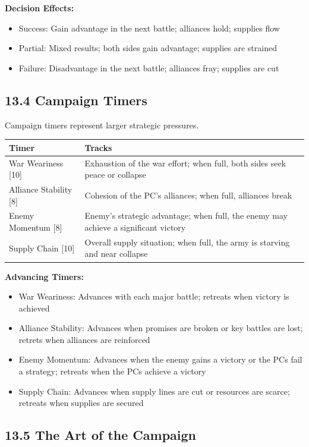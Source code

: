 \documentclass[11pt]{article}
\begin{document}
\textbf{Decision Effects:}
\begin{itemize}
  \item Success: Gain advantage in the next battle; alliances hold; supplies flow
  \item Partial: Mixed results; both sides gain advantage; supplies are strained
  \item Failure: Disadvantage in the next battle; alliances fray; supplies are cut
\end{itemize}

\subsection{13.4 Campaign Timers}

Campaign timers represent larger strategic pressures.

\begin{tabular}{|l|l|}
\hline
Timer & Tracks \\
\hline
War Weariness [10] & Exhaustion of the war effort; when full, both sides seek peace or collapse \\
\hline
Alliance Stability [8] & Cohesion of the PC's alliances; when full, alliances break \\
\hline
Enemy Momentum [8] & Enemy's strategic advantage; when full, the enemy may achieve a significant victory \\
\hline
Supply Chain [10] & Overall supply situation; when full, the army is starving and near collapse \\
\hline
\end{tabular}

\textbf{Advancing Timers:}
\begin{itemize}
  \item War Weariness: Advances with each major battle; retreats when victory is achieved
  \item Alliance Stability: Advances when promises are broken or key battles are lost; retrets when alliances are reinforced
  \item Enemy Momentum: Advances when the enemy gains a victory or the PCs fail a strategy; retreats when the PCs achieve a victory
  \item Supply Chain: Advances when supply lines are cut or resources are scarce; retreats when supplies are secured
\end{itemize}

\subsection{13.5 The Art of the Campaign}
\end{document}
